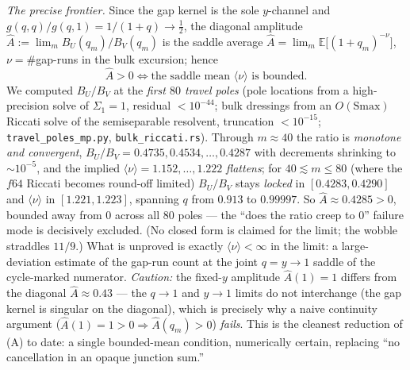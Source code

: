 \begin{remark}
\emph{The precise frontier.} Since the gap kernel is the sole $y$-channel and
$g(q,q)/g(q,1)=1/(1+q)\to\tfrac12$, the diagonal amplitude
$\widehat A:=\lim_m B_U(q_m)/B_V(q_m)$ is the saddle average
$\widehat A=\lim_m \mathbb E\bigl[(1+q_m)^{-\nu}\bigr]$, $\nu=\#$gap-runs in the bulk excursion;
hence \[\widehat A>0\iff\text{the saddle mean }\langle\nu\rangle\text{ is bounded.}\] We computed
$B_U/B_V$ at the \emph{first $80$ travel poles} (pole locations from a high-precision solve of
$\Sigma_1=1$, residual $<10^{-44}$; bulk dressings from an $O(\mathrm{Smax})$ Riccati solve of the
semiseparable resolvent, truncation $<10^{-15}$; \texttt{travel\_poles\_mp.py}, \texttt{bulk\_riccati.rs}).
Through $m\!\approx\!40$ the ratio is \emph{monotone and convergent}, $B_U/B_V=0.4735,0.4534,\dots,0.4287$
with decrements shrinking to $\sim\!10^{-5}$, and the implied $\langle\nu\rangle=1.152,\dots,1.222$
\emph{flattens}; for $40\lesssim m\le80$ (where the $f64$ Riccati becomes round-off limited) $B_U/B_V$
stays \emph{locked} in $[0.4283,0.4290]$ and $\langle\nu\rangle$ in $[1.221,1.223]$, spanning $q$ from
$0.913$ to $0.99997$. So $\widehat A\approx0.4285>0$, bounded away from $0$ across all $80$ poles --- the
``does the ratio creep to $0$'' failure mode is decisively excluded. (No closed form is claimed for the
limit; the wobble straddles $11/9$.) What is unproved is exactly $\langle\nu\rangle<\infty$ in the limit: a large-deviation estimate of the gap-run count at the joint $q=y\to1$ saddle of the
cycle-marked numerator. \emph{Caution:}
the fixed-$y$ amplitude $\widehat A(1)=1$ differs from the diagonal $\widehat A\approx0.43$ --- the
$q\to1$ and $y\to1$ limits do not interchange (the gap kernel is singular on the diagonal), which
is precisely why a naive continuity argument ($\widehat A(1)=1>0\Rightarrow\widehat A(q_m)>0$)
\emph{fails}. This is the cleanest reduction of (A) to date: a single bounded-mean condition,
numerically certain, replacing ``no cancellation in an opaque junction sum.''
\end{remark}

